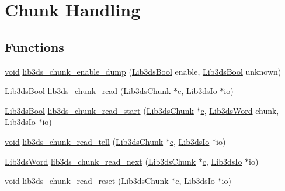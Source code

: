 \hypertarget{group__chunk}{\section{Chunk Handling}
\label{group__chunk}
}
\subsection*{Functions}
\begin{DoxyCompactItemize}
\item 
\hyperlink{group___u_a_v_objects_plugin_ga444cf2ff3f0ecbe028adce838d373f5c}{void} \hyperlink{group__chunk_ga7f3eeabe3149786f507aa6e7d1ccabdb}{lib3ds\-\_\-chunk\-\_\-enable\-\_\-dump} (\hyperlink{types_8h_a89dd7398a9ebbbf28011f8c32df67ad3}{Lib3ds\-Bool} enable, \hyperlink{types_8h_a89dd7398a9ebbbf28011f8c32df67ad3}{Lib3ds\-Bool} unknown)
\item 
\hyperlink{types_8h_a89dd7398a9ebbbf28011f8c32df67ad3}{Lib3ds\-Bool} \hyperlink{group__chunk_ga12bcd64e04dcd9b2adf99ab3a1baa877}{lib3ds\-\_\-chunk\-\_\-read} (\hyperlink{struct_lib3ds_chunk}{Lib3ds\-Chunk} $\ast$\hyperlink{glext_8h_a1f2d7f8147412c43ba2303a56f97ee73}{c}, \hyperlink{struct_lib3ds_io}{Lib3ds\-Io} $\ast$io)
\item 
\hyperlink{types_8h_a89dd7398a9ebbbf28011f8c32df67ad3}{Lib3ds\-Bool} \hyperlink{group__chunk_ga143270bca48fdd8456a3560c2cbd4a5a}{lib3ds\-\_\-chunk\-\_\-read\-\_\-start} (\hyperlink{struct_lib3ds_chunk}{Lib3ds\-Chunk} $\ast$\hyperlink{glext_8h_a1f2d7f8147412c43ba2303a56f97ee73}{c}, \hyperlink{types_8h_a439f68d12f4ad080599044949e41dba1}{Lib3ds\-Word} chunk, \hyperlink{struct_lib3ds_io}{Lib3ds\-Io} $\ast$io)
\item 
\hyperlink{group___u_a_v_objects_plugin_ga444cf2ff3f0ecbe028adce838d373f5c}{void} \hyperlink{group__chunk_ga6ca3f400ff69164eeeb85d1c6cb2e5e4}{lib3ds\-\_\-chunk\-\_\-read\-\_\-tell} (\hyperlink{struct_lib3ds_chunk}{Lib3ds\-Chunk} $\ast$\hyperlink{glext_8h_a1f2d7f8147412c43ba2303a56f97ee73}{c}, \hyperlink{struct_lib3ds_io}{Lib3ds\-Io} $\ast$io)
\item 
\hyperlink{types_8h_a439f68d12f4ad080599044949e41dba1}{Lib3ds\-Word} \hyperlink{group__chunk_ga38a914ace14f61d24a8a7bc103da2a72}{lib3ds\-\_\-chunk\-\_\-read\-\_\-next} (\hyperlink{struct_lib3ds_chunk}{Lib3ds\-Chunk} $\ast$\hyperlink{glext_8h_a1f2d7f8147412c43ba2303a56f97ee73}{c}, \hyperlink{struct_lib3ds_io}{Lib3ds\-Io} $\ast$io)
\item 
\hyperlink{group___u_a_v_objects_plugin_ga444cf2ff3f0ecbe028adce838d373f5c}{void} \hyperlink{group__chunk_ga7d6e69730ce4cc6c51bad397c88f7e45}{lib3ds\-\_\-chunk\-\_\-read\-\_\-reset} (\hyperlink{struct_lib3ds_chunk}{Lib3ds\-Chunk} $\ast$\hyperlink{glext_8h_a1f2d7f8147412c43ba2303a56f97ee73}{c}, \hyperlink{struct_lib3ds_io}{Lib3ds\-Io} $\ast$io)

\end{DoxyCompactItemize}
